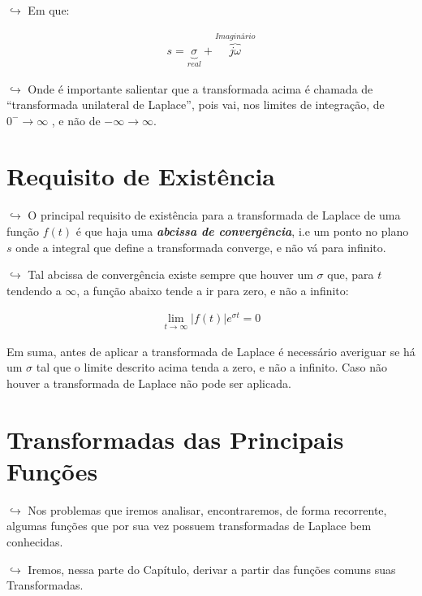 \documentclass[]{article}
\begin{document}
  \(\hookrightarrow\) Em que:

  \[
  \begin{align}
  s = \underbrace{\sigma}_{real} + \overbrace{j\omega}^{Imaginário}
  \end{align}
  \]

  \(\hookrightarrow\) Onde é importante salientar que a transformada acima
  é chamada de ``transformada unilateral de Laplace'', pois vai, nos
  limites de integração, de \(0^- \rightarrow \infty\) , e não de
  \(-\infty \rightarrow \infty\).

  \hypertarget{requisito-de-existuxeancia}{%
  \section{Requisito de Existência}\label{requisito-de-existuxeancia}}

  \(\hookrightarrow\) O principal requisito de existência para a
  transformada de Laplace de uma função \(f(t)\) é que haja uma
  \textbf{\emph{abcissa de convergência}}, i.e um ponto no plano \(s\)
  onde a integral que define a transformada converge, e não vá para
  infinito.

  \(\hookrightarrow\) Tal abcissa de convergência existe sempre que houver
  um \(\sigma\) que, para \(t\) tendendo a \(\infty\), a função abaixo
  tende a ir para zero, e não a infinito:

  \[
  \begin{align}
  \lim_{t\rightarrow \infty}|f(t)|e^{\sigma t} = 0
  \end{align}
  \]

  Em suma, antes de aplicar a transformada de Laplace é necessário
  averiguar se há um \(\sigma\) tal que o limite descrito acima tenda a
  zero, e não a infinito. Caso não houver a transformada de Laplace não
  pode ser aplicada.

  \hypertarget{transformadas-das-principais-funuxe7uxf5es}{%
  \section{Transformadas das Principais
  Funções}\label{transformadas-das-principais-funuxe7uxf5es}}

  \(\hookrightarrow\) Nos problemas que iremos analisar, encontraremos, de
  forma recorrente, algumas funções que por sua vez possuem transformadas
  de Laplace bem conhecidas.

  \(\hookrightarrow\) Iremos, nessa parte do Capítulo, derivar a partir
  das funções comuns suas Transformadas.
\end{document}
